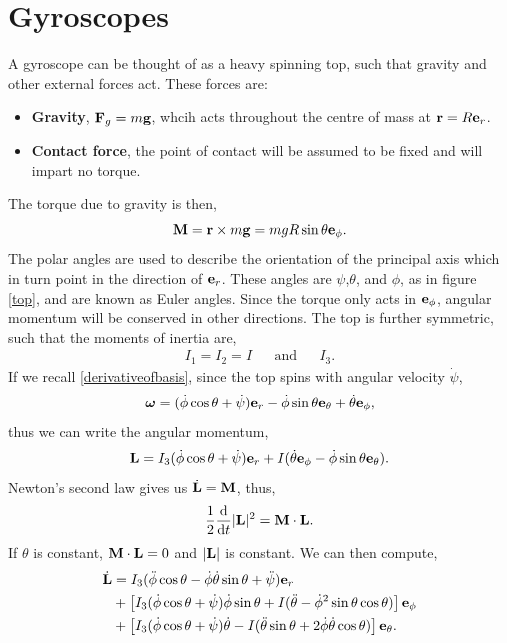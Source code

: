 \documentclass{book}
\begin{document}
\section{Gyroscopes}
A gyroscope can be thought of as a heavy spinning top, such that gravity and other external forces act. These forces are:
\begin{itemize}
	\item \textbf{Gravity}, $\vb{F}_g = m\vb{g}$, whcih acts throughout the centre of mass at $\vb{r} = R\vb{e}_r$. 
	\item \textbf{Contact force}, the point of contact will be assumed to be fixed and will impart no torque.
\end{itemize}
The torque due to gravity is then,
\begin{equation}
	\vb{M} = \vb{r} \times m\vb{g} = mg R \sin\theta \vb{e}_{\phi}. \label{torque due to gravity}
\end{equation}
The polar angles are used to describe the orientation of the principal axis which in turn point in the direction of $\vb{e}_r$. These angles are $\psi$,$\theta$, and $\phi$, as in figure \ref{top}, and are known as Euler angles. Since the torque only acts in $\vb{e}_{\phi}$, angular momentum will be conserved in other directions. The top is further symmetric, such that the moments of inertia are, 
\begin{align}
	I_1 = I_2 = I && \text{and} && I_3.
\end{align}
If we recall \eqref{derivativeofbasis}, since the top spins with angular velocity $\Dot{\psi}$,
\begin{equation}
	\vb*{\omega} = (\Dot{\phi}\cos\theta + \Dot{\psi})\vb{e}_r -\Dot{\phi}\sin\theta\vb{e}_{\theta} + \Dot{\theta}\vb{e}_{\phi},
\end{equation} 
thus we can write the angular momentum,
\begin{equation}
	\vb{L} = I_3(\Dot{\phi}\cos\theta + \Dot{\psi})\vb{e}_r + I(\Dot{\theta}\vb{e}_{\phi} - \Dot{\phi}\sin\theta\vb{e}_{\theta}).
\end{equation}
Newton's second law gives us $\Dot{\vb{L}} = \vb{M}$, thus, 
\begin{equation}
	\frac{1}{2}\dv{}{t}|\vb{L}|^2 = \vb{M}\cdot\vb{L}.
\end{equation}
If $\theta$ is constant, $\vb{M}\cdot\vb{L}=0$ and $|\vb{L}|$ is constant. We can then compute,
\begin{equation}
	\begin{split}
		\Dot{\vb{L}} & = I_3(\Ddot{\phi}\cos\theta - \Dot{\phi}\Dot{\theta}\sin\theta + \Ddot{\psi})\vb{e}_r \\
		& + \left[I_3(\Dot{\phi}\cos\theta + \Dot{\psi})\Dot{\phi}\sin\theta + I(\Ddot{\theta} - \Dot{\phi}^2\sin\theta\cos\theta)\right]\vb{e}_{\phi} \\
		& + \left[I_3(\Dot{\phi}\cos\theta + \Dot{\psi})\Dot{\theta} - I(\Ddot{\theta}\sin\theta + 2\Dot{\phi}\Dot{\theta}\cos\theta)\right]\vb{e}_{\theta}.
	\end{split}
\end{equation}
\end{document}
